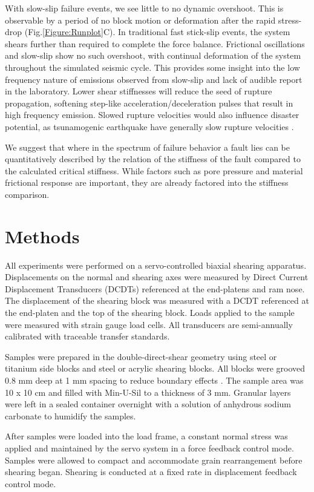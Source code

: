 \documentclass[11pt]{article}
\begin{document}
With slow-slip failure events, we see little to no dynamic overshoot. This is observable by a period of no block motion or
deformation after the rapid stress-drop (Fig.\ref{Figure:Runplot}C).  In
traditional fast stick-slip events, the system shears further than required to
complete the force balance. Frictional oscillations and slow-slip
show no such overshoot, with continual deformation of the system throughout the
simulated seismic cycle. This provides some insight into the low frequency
nature of emissions observed from slow-slip and lack of audible report in the
laboratory. Lower shear stiffnesses will reduce the seed of rupture propagation,
softening step-like acceleration/deceleration pulses that result in high
frequency emission. Slowed rupture velocities would also influence disaster potential, as
tsunamogenic earthquake have generally slow rupture velocities
\cite{Kanamori:1993, Bilek:1999}.

We suggest that where in the spectrum of failure behavior a fault lies can be
quantitatively described by the relation of the stiffness of the fault compared
to the calculated critical stiffness. While factors such as pore pressure and
material frictional response are important, they are already factored into  the
stiffness comparison.

\section{Methods}
All experiments were performed on a servo-controlled biaxial shearing apparatus.
Displacements on the normal and shearing axes were measured by Direct Current
Displacement Transducers (DCDTs) referenced at the end-platens and ram nose. The
displacement of the shearing block was measured with a DCDT referenced at the
end-platen and the top of the shearing block. Loads applied to the sample were
measured with strain gauge load cells. All transducers are semi-annually
calibrated with traceable transfer standards.

Samples were prepared in the double-direct-shear geometry using steel or
titanium side blocks and steel or acrylic shearing blocks. All blocks were
grooved 0.8 mm deep at 1 mm spacing to reduce boundary effects \cite{Anthony:2005}. The sample area
was 10 x 10 cm and filled with Min-U-Sil to a thickness of 3 mm. Granular layers
were left in a sealed container overnight with a solution of anhydrous sodium
carbonate to humidify the samples.

After samples were loaded into the load frame, a constant normal stress was
applied and maintained by the servo system in a force feedback control mode.
Samples were allowed to compact and accommodate grain rearrangement before
shearing began. Shearing is conducted at a fixed rate in displacement feedback
control mode.
\end{document}
